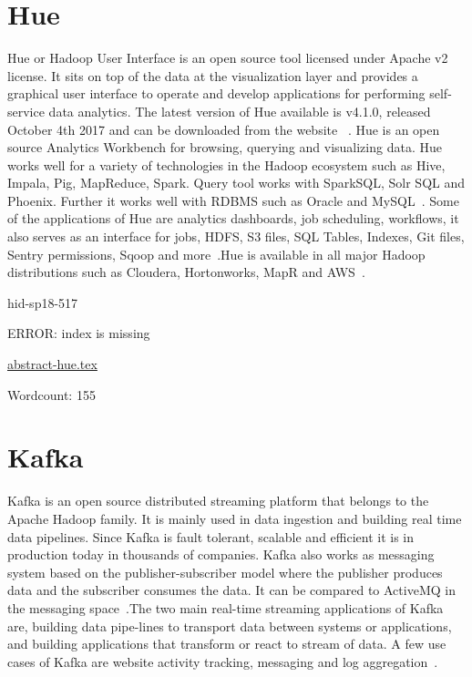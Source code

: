 \section{Hue}


Hue or Hadoop User Interface is an open source tool licensed 
under Apache v2 license. It sits on top of the data at the 
visualization layer and provides a graphical user interface to 
operate and develop applications for performing self-service 
data analytics.
The latest version of Hue available is v4.1.0, released October 
4th 2017 and can be downloaded from the website
~\cite{hid-sp18-517-hue-apache}. Hue is an open source Analytics
Workbench for browsing, querying and visualizing data. Hue works well
for a variety of technologies in the Hadoop ecosystem such as Hive,
Impala, Pig, MapReduce, Spark. Query tool works with SparkSQL, Solr SQL and Phoenix. Further it works 
well with RDBMS such as Oracle and
MySQL~\cite{hid-sp18-517-Hue-wiki}. Some of the applications of Hue are analytics dashboards, job scheduling, workflows, it also serves as an interface for jobs, HDFS, S3 files, SQL Tables, Indexes, Git files, Sentry permissions, Sqoop and more~\cite{hid-sp18-517-Hue-wiki}.Hue is available in all major Hadoop distributions such as Cloudera, 
Hortonworks, MapR and AWS~\cite{hid-sp18-517-Hue-wiki}.



\begin{IU}

hid-sp18-517

ERROR: index is missing

\href{https://github.com/cloudmesh-community/hid-sp18-517/blob/master//technology/abstract-hue.tex}{abstract-hue.tex}

 

Wordcount: 155

\end{IU}

\section{Kafka}

Kafka is an open source distributed streaming platform that belongs 
to the Apache Hadoop family. It is mainly used in data ingestion and 
building real time data pipelines. Since Kafka is fault tolerant, 
scalable and efficient it is in production today in thousands of 
companies. Kafka also works as messaging system based on the 
publisher-subscriber model where the publisher produces data and 
the subscriber consumes the data. It can be compared to ActiveMQ 
in the messaging space~\cite{hid-sp18-517-ApacheKafka}.The two main
real-time streaming applications of Kafka are, building  data
pipe-lines to transport data between systems or applications, and
building applications that transform or react to stream of data. A few
use cases of Kafka are website activity tracking, messaging 
and log aggregation~\cite{hid-sp18-517-ApacheKafka}.



